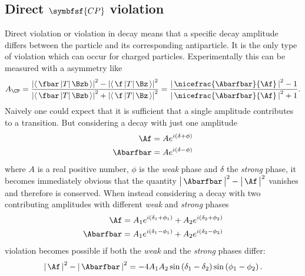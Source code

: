\subsection[head={Direct \CP violation},tocentry={Direct \CP violation}]{Direct $\symbfsf{C{}P}$ violation}
\label{sec:DirectCPV}

Direct \CP violation or \CP violation in decay means that a specific decay amplitude differs between the particle and its corresponding antiparticle.
It is the only type of \CP violation which can occur for charged particles.
Experimentally this can be measured with a \CP asymmetry like
\begin{equation}
A_{\CP}=\frac{\left|\left<\,\fbar\,|T|\,\Bzb\,\right>\right|^2-\left|\left<\,\f\,|T|\,\Bz\,\right>\right|^2}{\left|\left<\,\fbar\,|T|\,\Bzb\,\right>\right|^2+\left|\left<\,\f\,|T|\,\Bz\,\right>\right|^2} = \frac{\left|\,\nicefrac{\Abarfbar}{\Af}\,\right|^2-1}{\left|\,\nicefrac{\Abarfbar}{\Af}\,\right|^2+1}.
\end{equation}
Naively one could expect that it is sufficient that a single amplitude contributes to a transition.
But considering a decay with just one amplitude
\begin{equation}
\begin{split}
\Af&=Ae^{i\left(\delta+\phi\right)}\\
\Abarfbar&=Ae^{i\left(\delta-\phi\right)}
\end{split}
\end{equation}
where $A$ is a real positive number, $\phi$ is the \emph{weak} phase and $\delta$ the \emph{strong} phase, it becomes immediately obvious that the quantity $\big|\,\Abarfbar\,\big|^2-\big|\,\Af\,\big|^2$ vanishes and therefore \CP is conserved.
When instead considering a decay with two contributing amplitudes with different \emph{weak} and \emph{strong} phases
\begin{equation}
\begin{split}
\Af=A_1e^{i\left(\delta_1+\phi_1\right)}+A_2e^{i\left(\delta_2+\phi_2\right)}\\
\Abarfbar=A_1e^{i\left(\delta_1-\phi_1\right)}+A_2e^{i\left(\delta_2-\phi_2\right)}
\end{split}
\end{equation}
\CP violation becomes possible if both the \emph{weak} and the \emph{strong} phases differ:
\begin{equation}
\left|\,\Af\,\right|^2-\left|\,\Abarfbar\,\right|^2=-4A_1A_2\sin\left(\delta_1-\delta_2\right)\sin\left(\phi_1-\phi_2\right).
\end{equation}
